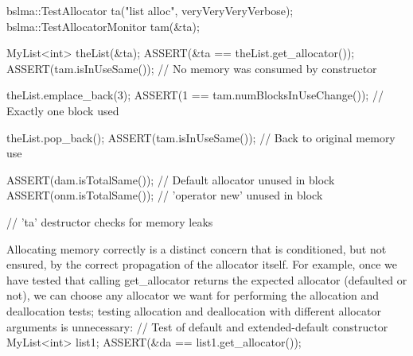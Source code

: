 {{{{{{{{{    bslma::TestAllocator ta("list alloc", veryVeryVeryVerbose);
    bslma::TestAllocatorMonitor tam(&ta);

    MyList<int> theList(&ta);
    ASSERT(&ta == theList.get_allocator());
    ASSERT(tam.isInUseSame());   // No memory was consumed by constructor

    theList.emplace_back(3);
    ASSERT(1 == tam.numBlocksInUseChange());  // Exactly one block used

    theList.pop_back();
    ASSERT(tam.isInUseSame());   // Back to original memory use

    ASSERT(dam.isTotalSame());   // Default allocator unused in block
    ASSERT(onm.isTotalSame());   // 'operator new' unused in block

    // 'ta' destructor checks for memory leaks
}
Allocating memory correctly is a distinct concern that is conditioned, but not ensured, by the correct propagation of the allocator itself. For example, once we have tested that calling get_allocator returns the expected allocator (defaulted or not), we can choose any allocator we want for performing the allocation and deallocation tests; testing allocation and deallocation with different allocator arguments is unnecessary:
// Test of default and extended-default constructor
MyList<int> list1;
ASSERT(&da == list1.get_allocator());

}}}}}}}}
